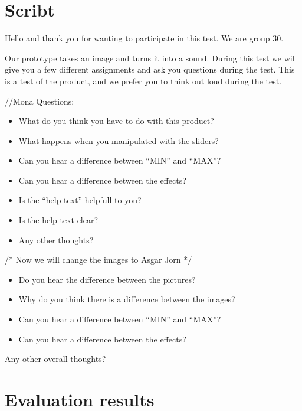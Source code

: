 \section{Scribt}

Hello and thank you for wanting to participate in this test. We are group 30.

Our prototype takes an image and turns it into a sound. During this test we will give you a few different assignments and ask you questions during the test. This is a test of the product, and we prefer you to think out loud during the test.

//Mona
Questions: 


\begin{itemize}
\item What do you think you have to do with this product?
\item What happens when you manipulated with the sliders?
\item Can you hear a difference between “MIN” and “MAX”?
\item Can you hear a difference between the effects?
\item Is the “help text” helpfull to you?
\item Is the help text clear?
\item Any other thoughts?
\end{itemize}



/* Now we will change the images to Asgar Jorn */
\begin{itemize}
\item Do you hear the difference between the pictures?
\item Why do you think there is a difference between the images?
\item Can you hear a difference between “MIN” and “MAX”?
\item Can you hear a difference between the effects?
\end{itemize}


Any other overall thoughts?


\section{Evaluation results}

%

